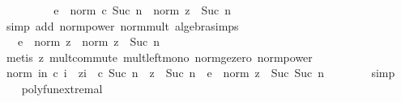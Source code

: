 \begin{isabellebody}
\ \ \ \ \isamarkupfalse%
\ \isamarkupfalse%
\ {\isachardoublequoteopen}{\isachardot}{\kern0pt}{\isachardot}{\kern0pt}{\isachardot}{\kern0pt}\ {\isasymle}\ {\isacharparenleft}{\kern0pt}e\ {\isacharplus}{\kern0pt}\ norm\ {\isacharparenleft}{\kern0pt}c\ {\isacharparenleft}{\kern0pt}Suc\ n{\isacharparenright}{\kern0pt}{\isacharparenright}{\kern0pt}{\isacharparenright}{\kern0pt}\ {\isacharasterisk}{\kern0pt}\ norm\ z\ {\isacharcircum}{\kern0pt}\ Suc\ n{\isachardoublequoteclose}\isanewline
\ \ \ \ \ \ \isamarkupfalse%
\ {\isacharparenleft}{\kern0pt}simp\ add{\isacharcolon}{\kern0pt}\ norm{\isacharunderscore}{\kern0pt}power\ norm{\isacharunderscore}{\kern0pt}mult\ algebra{\isacharunderscore}{\kern0pt}simps{\isacharparenright}{\kern0pt}\isanewline
\ \ \ \ \isamarkupfalse%
\ \isamarkupfalse%
\ {\isachardoublequoteopen}{\isachardot}{\kern0pt}{\isachardot}{\kern0pt}{\isachardot}{\kern0pt}\ {\isasymle}\ {\isacharparenleft}{\kern0pt}e\ {\isacharasterisk}{\kern0pt}\ norm\ z{\isacharparenright}{\kern0pt}\ {\isacharasterisk}{\kern0pt}\ norm\ z\ {\isacharcircum}{\kern0pt}\ Suc\ n{\isachardoublequoteclose}\isanewline
\ \ \ \ \ \ \isamarkupfalse%
\ {\isacharparenleft}{\kern0pt}metis\ z{}\ mult{\isachardot}{\kern0pt}commute\ mult{\isacharunderscore}{\kern0pt}left{\isacharunderscore}{\kern0pt}mono\ norm{\isacharunderscore}{\kern0pt}ge{\isacharunderscore}{\kern0pt}zero\ norm{\isacharunderscore}{\kern0pt}power{\isacharparenright}{\kern0pt}\isanewline
\ \ \ \ \isamarkupfalse%
\ \isamarkupfalse%
\ {\isachardoublequoteopen}norm\ {\isacharparenleft}{\kern0pt}{\isacharparenleft}{\kern0pt}{\isasymSum}i{\isasymle}n{\isachardot}{\kern0pt}\ c\ i\ {\isacharasterisk}{\kern0pt}\ z{\isacharcircum}{\kern0pt}i{\isacharparenright}{\kern0pt}\ {\isacharplus}{\kern0pt}\ c\ {\isacharparenleft}{\kern0pt}Suc\ n{\isacharparenright}{\kern0pt}\ {\isacharasterisk}{\kern0pt}\ z\ {\isacharcircum}{\kern0pt}\ Suc\ n{\isacharparenright}{\kern0pt}\ {\isasymle}\ e\ {\isacharasterisk}{\kern0pt}\ norm\ z\ {\isacharcircum}{\kern0pt}\ Suc\ {\isacharparenleft}{\kern0pt}Suc\ n{\isacharparenright}{\kern0pt}{\isachardoublequoteclose}\isanewline
\ \ \ \ \ \ \isamarkupfalse%
\ simp\isanewline
\ \ \isamarkupfalse%
\isanewline
{}\isamarkupfalse%
%
\endisatagproof
{\isafoldproof}%
%
\isadelimproof
\isanewline
%
\endisadelimproof
\isanewline
{}\isamarkupfalse%
\ polyfun{\isacharunderscore}{\kern0pt}extremal{\isacharcolon}{\kern0pt}\ \isanewline

\end{isabellebody}
